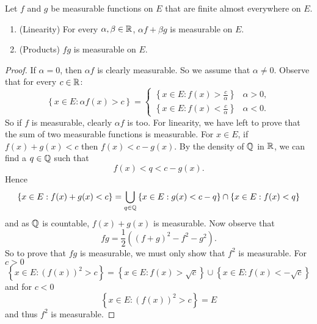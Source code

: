 
\begin{theorem}[]
	Let $f$ and $g$ be measurable functions on $E$ that are finite
	almost everywhere on $E$.
	\begin{enumerate}
		\item (Linearity) For every $\alpha, \beta \in \mathbb{R}$,
			$\alpha f + \beta g$ is measurable on $E$.
		\item (Products) $fg$ is measurable on $E$.
	\end{enumerate}
\end{theorem}

\begin{proof}
	If $\alpha = 0$, then $\alpha f$ is clearly measurable.
	So we assume that $\alpha \neq 0$.
	Observe that for every $c \in \mathbb{R}$:
	\[
		\left\{
			x \in E: \alpha f(x) > c
		\right\}
		=
		\begin{cases}
			\left\{
				x \in E: f(x) > \frac{c}{\alpha}
			\right\}
			& \alpha > 0, \\
			\left\{
				x \in E: f(x) < \frac{c}{\alpha}
			\right\}
			& \alpha < 0.
		\end{cases}
	\]
	So if $f$ is measurable, clearly $\alpha f$ is too.
	For linearity, we have left to prove that the sum of two
	measurable functions is measurable.
	For $x \in E$, if $f(x) + g(x) < c$ then
	$f(x) < c - g(x)$.
	By the density of $\mathbb{Q}$ in $\mathbb{R}$,
	we can find a $q \in \mathbb{Q}$ such that
	\[
		f(x) < q < c - g(x).
	\]
	Hence
	\[
		\left\{
			x \in E: f(x) + g(x) < c
		\right\}
		= \bigcup_{q \in \mathbb{Q}}
		\left\{
			x \in E: g(x) < c - q
		\right\}
		\cap
		\left\{
			x \in E: f(x) < q
		\right\}
	\]
	and as $\mathbb{Q}$ is countable, $f(x) + g(x)$ is measurable.
	Now observe that
	\[
		fg = \frac12\left( 
			(f+g)^2 - f^2 - g^2 
		\right).
	\]
	So to prove that $fg$ is measurable, we must only show that
	$f^2$ is measurable.
	For $c > 0$
	\[
		\left\{
			x \in E: (f(x))^2 > c
		\right\}
		=
		\left\{
			x \in E: f(x) > \sqrt c
		\right\}
		\cup
		\left\{
			x \in E: f(x) < -\sqrt c
		\right\}
	\]
	and for $c < 0$
	\[
		\left\{
			x \in E: (f(x))^2 > c
		\right\}
		= E
	\]
	and thus $f^2$ is measurable.
\end{proof}

